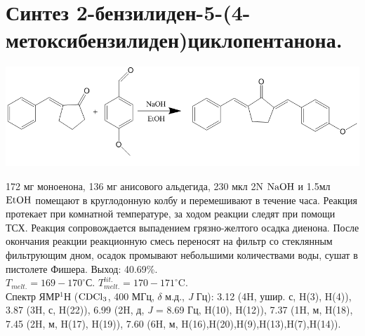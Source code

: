 \documentclass[a4paper]{article}
\begin{document}
\section{Синтез 2-бензилиден-5-(4-метоксибензилиден)циклопентанона.}
\begin{center}
\includegraphics[scale=0.35]{pictures/2.png}
\end{center}
172 мг  моноенона, 136 мг анисового альдегида, 230 мкл 2N $\ce{NaOH}$ и 1.5мл $\ce{EtOH}$ помещают в круглодонную колбу и перемешивают в течение часа. Реакция протекает при комнатной температуре, за ходом реакции следят при помощи ТСХ. Реакция сопровождается выпадением грязно-желтого осадка диенона. После окончания реакции реакционную смесь переносят на фильтр со стеклянным фильтрующим дном, осадок промывают небольшими количествами воды, сушат в пистолете Фишера. Выход: 40.69$\%$. \\
$T_{melt.} = 169-170^{\circ}$С. $T_{melt.}^{lit.} = 170-171^{\circ}$C. \cite{rosamilia2006} \\
Спектр ЯМР$^{1}$Н ($\ce{CDCl3}$, 400 МГц, $\delta$ м.д., \textit{J} Гц): 3.12 (4H, ушир. с, H(3), H(4)), 3.87 (3H, с, H(22)), 6.99 (2H, д, \textit{J} = 8.69 Гц, H(10), H(12)), 7.37 (1H, м, H(18), 7.45 (2H, м, H(17), H(19)), 7.60 (6H, м, H(16),H(20),H(9),H(13),H(7),H(14)).
\end{document}
